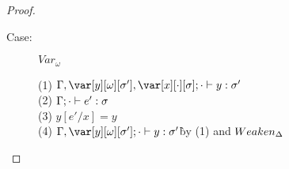 \begin{proof}
\begin{description}

%
%
\item[Case:] $Var_\omega$
\begin{tabbing}
    (1) $\G, \yo, \x[\cdot][\s]; \cdot \vdash y : \s'$\\
    (2) $\Gamma; \cdot \vdash e' : \sigma$\\
    (3) $y[e'/x] = y$\\
    (4) $\G,\yo;\cdot \vdash y : \s'$\` by (1) and $Weaken_\Delta$\\
\end{tabbing}


\end{description}
\end{proof}
